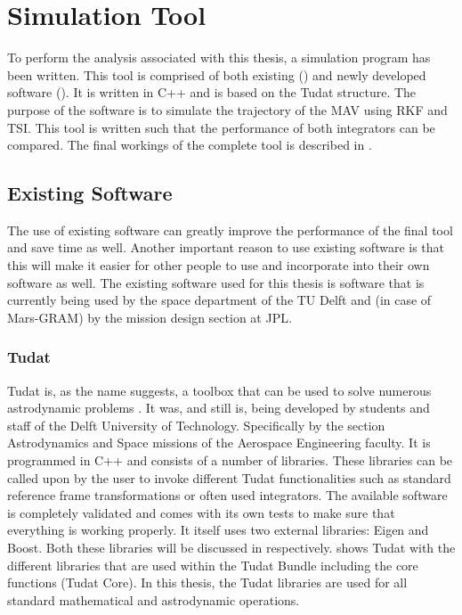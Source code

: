 \chapter{Simulation Tool} 

\label{ch:programSimulationTool}
To perform the analysis associated with this thesis, a simulation program has been written. This tool is comprised of both existing () and newly developed software (). It is written in C++ and is based on the \ac{Tudat} structure. The purpose of the software is to simulate the trajectory of the \ac{MAV} using \ac{RKF} and \ac{TSI}. This tool is written such that the performance of both integrators can be compared. The final workings of the complete tool is described in .

\section{Existing Software}
\label{sec:existingsoftware}
The use of existing software can greatly improve the performance of the final tool and save time as well. Another important reason to use existing software is that this will make it easier for other people to use and incorporate into their own software as well. The existing software used for this thesis is software that is currently being used by the space department of the TU Delft and (in case of Mars-\ac{GRAM}) by the mission design section at \ac{JPL}. 


\subsection{\acl{Tudat}}
\label{subsec:tudat}
\ac{Tudat} is, as the name suggests, a toolbox that can be used to solve numerous astrodynamic problems \citep{dirkx2016tudat}. It was, and still is, being developed by students and staff of the Delft University of Technology. Specifically by the section Astrodynamics and Space missions of the Aerospace Engineering faculty. It is programmed in C++ and consists of a number of libraries. These libraries can be called upon by the user to invoke different \ac{Tudat} functionalities such as standard reference frame transformations or often used integrators. The available software is completely validated and comes with its own tests to make sure that everything is working properly. It itself uses two external libraries: Eigen and Boost. Both these libraries will be discussed in  respectively.  shows \ac{Tudat} with the different libraries that are used within the \ac{Tudat} Bundle including the core functions (\ac{Tudat} Core).
In this thesis, the \ac{Tudat} libraries are used for all standard mathematical and astrodynamic operations.

